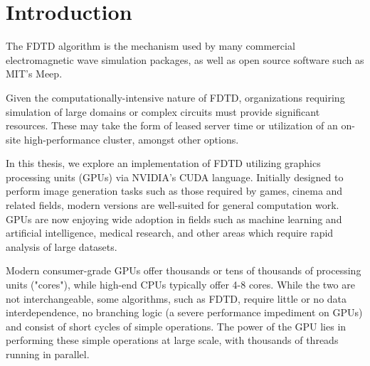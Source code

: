 
\chapter{Introduction} \label{ch:introduction}


%
%



The FDTD \cite{Yee} algorithm is the mechanism used by many commercial electromagnetic wave simulation packages, as well as open source software such as MIT's Meep\cite{OskooiRo10}. 

Given the computationally-intensive nature of FDTD, organizations requiring simulation of large domains or complex circuits must provide significant resources. These may take the form of leased server time or utilization of an on-site high-performance cluster, amongst other options.

In this thesis, we explore an implementation of FDTD utilizing graphics processing units (GPUs) via NVIDIA's CUDA\cite{cuda} language. Initially designed to perform image generation tasks such as those required by games, cinema and related fields, modern versions are well-suited for general computation work. GPUs are now enjoying wide adoption in fields such as machine learning\cite{Raina09largescaledeep} and artificial intelligence\cite{wu2009clustering}, medical research\cite{QIMS1079}, and other areas which require rapid analysis of large datasets.

Modern consumer-grade GPUs offer thousands or tens of thousands of processing units ("cores"), while high-end CPUs typically offer 4-8 cores. While the two are not interchangeable, some algorithms, such as FDTD, require little or no data interdependence, no branching logic (a severe performance impediment on GPUs) and consist of short cycles of simple operations. The power of the GPU lies in performing these simple operations at large scale, with thousands of threads running in parallel. 

